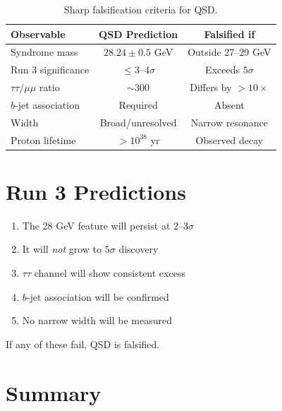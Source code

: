 \documentclass[11pt,a4paper]{article}
\theoremstyle{definition}
\begin{document}
\begin{table}[h]
\centering
\begin{tabular}{p{4cm}cc}
\toprule
\textbf{Observable} & \textbf{QSD Prediction} & \textbf{Falsified if} \\
\midrule
Syndrome mass & $28.24 \pm 0.5$ GeV & Outside 27--29 GeV \\
Run 3 significance & $\leq 3$--$4\sigma$ & Exceeds $5\sigma$ \\
$\tau\tau/\mu\mu$ ratio & $\sim 300$ & Differs by $>10\times$ \\
$b$-jet association & Required & Absent \\
Width & Broad/unresolved & Narrow resonance \\
Proton lifetime & $> 10^{38}$ yr & Observed decay \\
\bottomrule
\end{tabular}
\caption{Sharp falsification criteria for QSD.}
\end{table}

\section{Run 3 Predictions}

\begin{enumerate}[nosep]
    \item The 28 GeV feature will persist at $2$--$3\sigma$
    \item It will \emph{not} grow to $5\sigma$ discovery
    \item $\tau\tau$ channel will show consistent excess
    \item $b$-jet association will be confirmed
    \item No narrow width will be measured
\end{enumerate}

If any of these fail, QSD is falsified.

\section{Summary}
\end{document}
